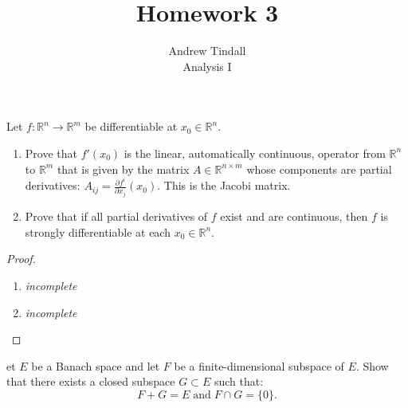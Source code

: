 \documentclass[12pt]{article}
\newcommand{\R}{\mathbb{R}}
\theoremstyle{definition}
\newenvironment{problem}[2][Problem]{\begin{trivlist}
\item[\hskip \labelsep {\bfseries #1}\hskip \labelsep {\bfseries #2.}]}{\end{trivlist}}
\begin{document}
 
 
\title{Homework 3}
\author{Andrew Tindall\\
Analysis I}
 
\maketitle
\begin{problem}{1}
	Let $f: \R^n \to \R^m$ be differentiable at $x_0 \in \R^n$.
	\begin{enumerate}[label=(\roman*)]
		\item Prove that $f'(x_0)$ is the linear, automatically continuous, operator from $\R^n$ to $\R^m$ that is given by the matrix $A \in \R^{n\times m}$ whose components are partial derivatives: $A_{ij} = \frac{\partial f^i}{\partial x_j}(x_0)$. This is the Jacobi matrix.
		\item Prove that if all partial derivatives of $f$ exist and are continuous, then $f$ is strongly differentiable at each $x_0 \in \R^n$.
	\end{enumerate}
\end{problem}
\begin{proof}
	\begin{enumerate}[label=(\roman*)]
		\item \textit{incomplete}
		\item \textit{incomplete}
	\end{enumerate}
\end{proof}
\begin{problem}
Let $E$ be a Banach space and let $F$ be a finite-dimensional subspace of $E$. Show that there exists a closed subspace $G \subset E$ such that:
\[
F + G = E \;\text{and}\; F \cap G= \{0\}.
\]
\end{problem}
\end{document}
